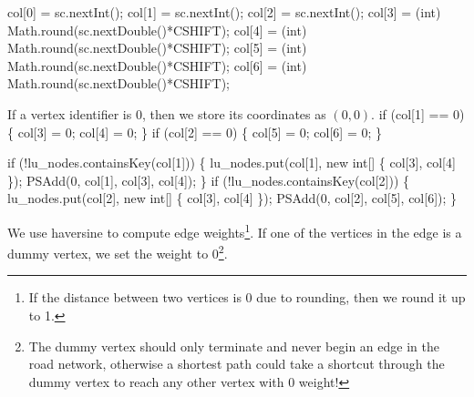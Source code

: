 \documentclass{article}
\def\nwendcode{\endtrivlist \endgroup}
\let\nwdocspar=\par
\theoremstyle{definition}
\begin{document}
\nwenddocs{}\endmoddef{}
col[0] = sc.nextInt();
col[1] = sc.nextInt();
col[2] = sc.nextInt();
col[3] = (int) Math.round(sc.nextDouble()*CSHIFT);
col[4] = (int) Math.round(sc.nextDouble()*CSHIFT);
col[5] = (int) Math.round(sc.nextDouble()*CSHIFT);
col[6] = (int) Math.round(sc.nextDouble()*CSHIFT);
\nwendcode{}\nwdocspar
If a vertex identifier is $0$, then we store its coordinates as $(0,0)$.
\nwenddocs{}\endmoddef{}
if (col[1] == 0) \{
  col[3] = 0;
  col[4] = 0;
\}
if (col[2] == 0) \{
  col[5] = 0;
  col[6] = 0;
\}
\nwendcode{}\nwdocspar
\nwenddocs{}\endmoddef{}
if (!lu_nodes.containsKey(col[1])) \{
  lu_nodes.put(col[1], new int[] \{ col[3], col[4] \});
  PSAdd(0, col[1], col[3], col[4]);
\}
if (!lu_nodes.containsKey(col[2])) \{
  lu_nodes.put(col[2], new int[] \{ col[3], col[4] \});
  PSAdd(0, col[2], col[5], col[6]);
\}
\nwendcode{}\nwdocspar
We use haversine to compute edge weights\footnote{If the distance between two
vertices is 0 due to rounding, then we round it up to 1.}.  If one of the
vertices in the edge is a dummy vertex, we set the weight to 0\footnote{The
dummy vertex should only terminate and never begin an edge in the road network,
otherwise a shortest path could take a shortcut through the dummy vertex to
reach any other vertex with 0 weight!}.
\nwenddocs{}\endmoddef{}
\end{document}
